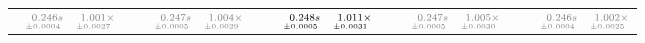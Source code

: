 \documentclass[a4paper,UKenglish]{lipics-v2016}
\begin{document}
\begin{table*}
\begin{adjustbox}{width=1.2\textwidth,center}
\begin{tabular}{rrrp{.1em}rrrp{.1em}rrrp{.1em}rrrp{.1em}rrr}
\cellcolor{black!5}{\tiny \color{gray}{p$_{12}$}:}&\cellcolor{black!5}$\substack{\mathmakebox[.7cm][r]{\color{gray}{0.246}}\color{gray}{s}\\{\mathmakebox[.7cm][r]{\scriptscriptstyle \color{gray}{\pm 0.0004}}}}$&\cellcolor{black!5}$\substack{\mathmakebox[.7cm][r]{\color{gray}{1.001}}\color{gray}{\times}\\{\mathmakebox[.7cm][r]{\scriptscriptstyle \color{gray}{\pm 0.0027}}}}$&&\cellcolor{black!5}{\tiny \color{gray}{p$_{28}$}:}&\cellcolor{black!5}$\substack{\mathmakebox[.7cm][r]{\color{gray}{0.247}}\color{gray}{s}\\{\mathmakebox[.7cm][r]{\scriptscriptstyle \color{gray}{\pm 0.0005}}}}$&\cellcolor{black!5}$\substack{\mathmakebox[.7cm][r]{\color{gray}{1.004}}\color{gray}{\times}\\{\mathmakebox[.7cm][r]{\scriptscriptstyle \color{gray}{\pm 0.0029}}}}$&&\cellcolor{black!5}{\tiny p$_{44}$:}&\cellcolor{black!5}$\substack{\mathmakebox[.7cm][r]{0.248}s\\{\mathmakebox[.7cm][r]{\scriptscriptstyle \pm 0.0005}}}$&\cellcolor{black!5}$\substack{\mathmakebox[.7cm][r]{1.011}\times\\{\mathmakebox[.7cm][r]{\scriptscriptstyle \pm 0.0031}}}$&&\cellcolor{black!5}{\tiny \color{gray}{p$_{60}$}:}&\cellcolor{black!5}$\substack{\mathmakebox[.7cm][r]{\color{gray}{0.247}}\color{gray}{s}\\{\mathmakebox[.7cm][r]{\scriptscriptstyle \color{gray}{\pm 0.0005}}}}$&\cellcolor{black!5}$\substack{\mathmakebox[.7cm][r]{\color{gray}{1.005}}\color{gray}{\times}\\{\mathmakebox[.7cm][r]{\scriptscriptstyle \color{gray}{\pm 0.0030}}}}$&&\cellcolor{black!5}{\tiny \color{gray}{p$_{76}$}:}&\cellcolor{black!5}$\substack{\mathmakebox[.7cm][r]{\color{gray}{0.246}}\color{gray}{s}\\{\mathmakebox[.7cm][r]{\scriptscriptstyle \color{gray}{\pm 0.0004}}}}$&\cellcolor{black!5}$\substack{\mathmakebox[.7cm][r]{\color{gray}{1.002}}\color{gray}{\times}\\{\mathmakebox[.7cm][r]{\scriptscriptstyle \color{gray}{\pm 0.0025}}}}$\\

\end{tabular}
\end{adjustbox}
\end{table*}
\end{document}

